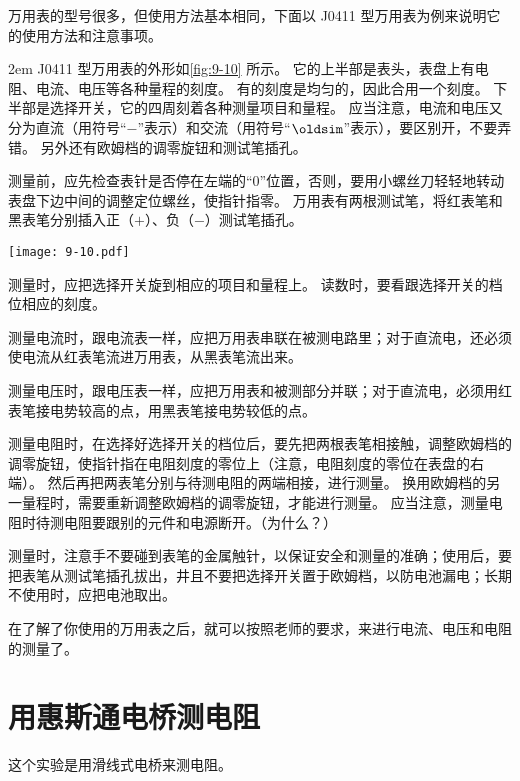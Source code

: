 万用表的型号很多，但使用方法基本相同，下面以 J0411 型万用表为例来说明它的使用方法和注意事项。

\medskip\noindent
\begin{minipage}{0.47\linewidth}\parindent2em
J0411 型万用表的外形如\cref{fig:9-10} 所示。
它的上半部是表头，表盘上有电阻、电流、电压等各种量程的刻度。
有的刻度是均匀的，因此合用一个刻度。
下半部是选择开关，它的四周刻着各种测量项目和量程。
应当注意，电流和电压又分为直流（用符号“$-$”表示）和交流（用符号“$\oldsim$”表示），要区别开，不要弄错。
另外还有欧姆档的调零旋钮和测试笔插孔。

测量前，应先检查表针是否停在左端的“0”位置，否则，要用小螺丝刀轻轻地转动表盘下边中间的调整定位螺丝，使指针指零。
万用表有两根测试笔，将红表笔和黑表笔分别插入正（$+$）、负（$-$）测试笔插孔。
\end{minipage}\hfill
\begin{minipage}{0.48\linewidth}
  \begin{figurehere}
    \texttt{[image: 9-10.pdf]}
    \caption{}\label{fig:9-10}
  \end{figurehere}
\end{minipage}

\medskip
测量时，应把选择开关旋到相应的项目和量程上。
读数时，要看跟选择开关的档位相应的刻度。

测量电流时，跟电流表一样，应把万用表串联在被测电路里；对于直流电，还必须使电流从红表笔流进万用表，从黑表笔流出来。

测量电压时，跟电压表一样，应把万用表和被测部分并联；对于直流电，必须用红表笔接电势较高的点，用黑表笔接电势较低的点。

测量电阻时，在选择好选择开关的档位后，要先把两根表笔相接触，调整欧姆档的调零旋钮，使指针指在电阻刻度的零位上（注意，电阻刻度的零位在表盘的右端）。
然后再把两表笔分别与待测电阻的两端相接，进行测量。
换用欧姆档的另一量程时，需要重新调整欧姆档的调零旋钮，才能进行测量。
应当注意，测量电阻时待测电阻要跟别的元件和电源断开。（为什么？）

测量时，注意手不要碰到表笔的金属触针，以保证安全和测量的准确；使用后，要把表笔从测试笔插孔拔出，井且不要把选择开关置于欧姆档，以防电池漏电；长期不使用时，应把电池取出。

在了解了你使用的万用表之后，就可以按照老师的要求，来进行电流、电压和电阻的测量了。

\section{用惠斯通电桥测电阻}
这个实验是用滑线式电桥来测电阻。


